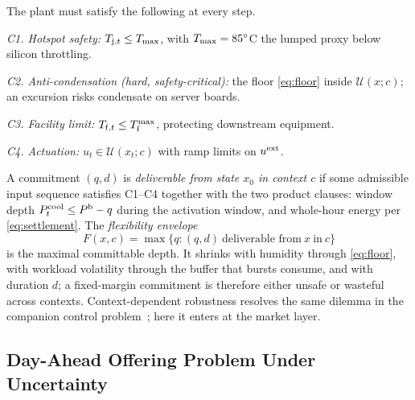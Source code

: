 The plant must satisfy the following at every step.

\emph{C1. Hotspot safety:} $\Tj[t] \le \Tmax$, with $T_{\max}=85^\circ$C the
lumped proxy below silicon throttling.

\emph{C2. Anti-condensation (hard, safety-critical):} the floor
\eqref{eq:floor} inside $\mathcal{U}(x;c)$; an excursion risks condensate on
server boards.

\emph{C3. Facility limit:} $\Tf[t] \le \Tf^{\max}$, protecting downstream
equipment.

\emph{C4. Actuation:} $u_t \in \mathcal{U}(x_t;c)$ with ramp limits on
$u^{\mathrm{ext}}$.

A commitment $(q,d)$ is \emph{deliverable from state $x_0$ in context $c$} if
some admissible input sequence satisfies C1--C4 together with the two product
clauses: window depth $P^{\mathrm{cool}}_t \le P^{\mathrm{b}} - q$ during the activation window,
and whole-hour energy per \eqref{eq:settlement}. The \emph{flexibility
envelope}
\begin{equation}
F(x,c) = \max\bigl\{q : (q,d)\ \text{deliverable from}\ x\ \text{in}\ c\bigr\}
\label{eq:envelope_def}
\end{equation}
is the maximal committable depth. It shrinks with humidity through
\eqref{eq:floor}, with workload volatility through the buffer that bursts
consume, and with duration $d$; a fixed-margin commitment is therefore either
unsafe or wasteful across contexts. Context-dependent robustness resolves the
same dilemma in the companion control problem~\cite{shen2026cdro}; here it
enters at the market layer.

\vspace{-4mm}
\subsection{Day-Ahead Offering Problem Under Uncertainty}
\label{subsec:problem}

